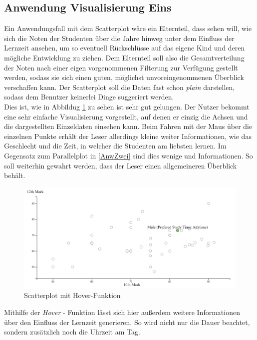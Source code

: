 \documentclass[usegeometry=true]{scrartcl}
\begin{document}
\subsection{Anwendung Visualisierung Eins}
\label{AnwEins}
Ein Anwendungsfall mit dem Scatterplot wäre ein Elternteil, dass sehen will, wie sich die Noten der Studenten über die Jahre hinweg unter dem Einfluss der Lernzeit ansehen, um so eventuell Rückschlüsse auf das eigene Kind und deren mögliche Entwicklung zu ziehen. Dem Elternteil soll also die Gesamtverteilung der Noten nach einer eigen vorgenommenen Filterung zur Verfügung gestellt werden, sodass sie sich einen guten, möglichst unvoreingenommenen Überblick verschaffen kann. Der Scatterplot soll die Daten fast schon \textit{plain} darstellen, sodass dem Benutzer keinerlei Dinge suggeriert werden.\\

\noindent Dies ist, wie in Abbildug \ref{ScatterAnw} zu sehen ist sehr gut gelungen. Der Nutzer bekommt eine sehr einfache Visualisierung vorgestellt, auf denen er einzig die Achsen und die dargestellten Einzeldaten einsehen kann. Beim Fahren mit der Maus über die einzelnen Punkte erhält der Leser allerdings kleine weiter Informationen, wie das Geschlecht und die Zeit, in welcher die Studenten am liebsten lernen. Im Gegensatz zum Parallelplot in \ref{AnwZwei} sind dies wenige und Informationen. So soll weiterhin gewahrt werden, dass der Leser einen allgemeineren Überblick behält. 

\begin{figure}[h]
\begin{center}
	\includegraphics[scale=.25]{ScatterAnw.png}
	\caption{Scatterplot mit Hover-Funktion}
	\label{ScatterAnw}
\end{center}
\end{figure}

\noindent Mithilfe der \textit{Hover} - Funktion lässt sich hier außerdem weitere Informationen über den Einfluss der Lernzeit generieren. So wird nicht nur die Dauer beachtet, sondern zusätzlich noch die Uhrzeit am Tag.
\end{document}
